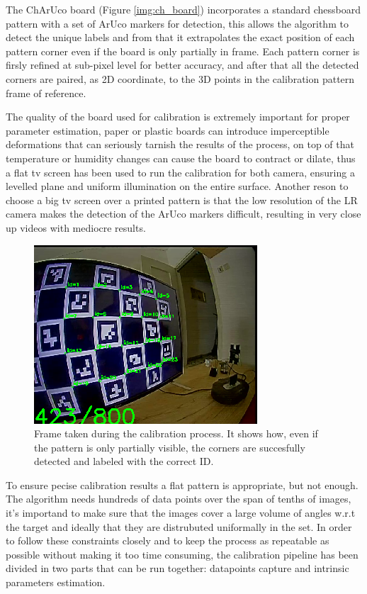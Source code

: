The ChArUco board (Figure \ref{img:ch_board}) incorporates a standard chessboard pattern with a set of ArUco markers for detection, this allows the algorithm to detect the unique labels and from that it extrapolates the exact position of each pattern corner even if the board is only partially in frame. Each pattern corner is firsly refined at sub-pixel level for better accuracy, and after that all the detected corners are paired, as 2D coordinate, to the 3D points in the calibration pattern frame of reference.

The quality of the board used for calibration is extremely important for proper parameter estimation, paper or plastic boards can introduce imperceptible deformations that can seriously tarnish the results of the process, on top of that temperature or humidity changes can cause the board to contract or dilate, thus a flat tv screen has been used to run the calibration for both camera, ensuring a levelled plane and uniform illumination on the entire surface. Another reson to choose a big tv screen over a printed pattern is that the low resolution of the LR camera makes the detection of the ArUco markers difficult, resulting in very close up videos with mediocre results.

\begin{figure}[h]
  \centering
  \includegraphics[scale=0.7]{figures/not_all.png}
  \caption{Frame taken during the calibration process. It shows how, even if the pattern is only partially visible, the corners are succesfully detected and labeled with the correct ID.}
  \label{img:ch_calib}
\end{figure}

To ensure pecise calibration results a flat pattern is appropriate, but not enough. The algorithm needs hundreds of data points over the span of tenths of images, it's importand to make sure that the images cover a large volume of angles w.r.t the target and ideally that they are distrubuted uniformally in the set. In order to follow these constraints closely and to keep the process as repeatable as possible without making it too time consuming, the calibration pipeline has been divided in two parts that can be run together: datapoints capture and intrinsic parameters estimation.

